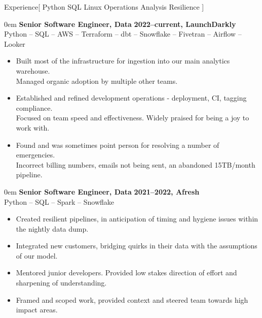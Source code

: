 \documentclass[11pt,a4paper]{article}
\newenvironment{worksection}[3]{
    \begin{addmargin}[0.5em]{0em}
    {\large\bfseries #1} \hfill {\bfseries #2}\\%
    \hspace*{1em}#3
    \begin{itemize}
        [label=-, topsep=0pt, itemsep=0.5ex, parsep=0pt, leftmargin=1em]
}{
    \end{itemize}
    \end{addmargin}
    \medskip
}
\begin{document}
\sloppy  %


\vspace{1em}

\begin{mysection}{Experience}[
    Python
    \textbullet{} SQL
    \textbullet{} Linux
    \textbullet{} Operations
    \textbullet{} Analysis
    \textbullet{} Resilience
]

  \begin{worksection}
        {Senior Software Engineer, Data}
        {2022--current, LaunchDarkly}
        {Python -- SQL -- AWS -- Terraform -- dbt -- Snowflake -- Fivetran -- Airflow -- Looker}


    \item Built most of the infrastructure for ingestion into our main analytics
          warehouse.
    \\    Managed organic adoption by multiple other teams.

    \item Established and refined development operations - deployment, CI,
          tagging compliance.
    \\    Focused on team speed and effectiveness.
          Widely praised for being a joy to work with.

    \item Found and was sometimes point person for resolving a number of
          emergencies.
    \\    Incorrect billing numbers, emails not being sent,
          an abandoned 15TB/month pipeline.

  \end{worksection}

  \begin{worksection}
        {Senior Software Engineer, Data}
        {2021--2022, Afresh}
        {Python -- SQL -- Spark -- Snowflake}

    \item Created resilient pipelines, in anticipation of timing and hygiene
          issues within the nightly data dump.
    \item Integrated new customers, bridging quirks in their data with the
          assumptions of our model.
    \item Mentored junior developers.  Provided low stakes direction of effort
          and sharpening of understanding.
    \item Framed and scoped work, provided context and steered team towards
          high impact areas.


\end{worksection}
\end{mysection}
\end{document}
